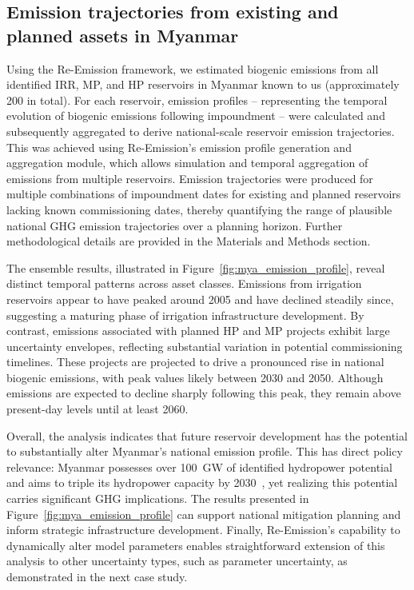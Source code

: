 \documentclass[review, authoryear, 1p]{elsarticle} %
\begin{document}
\subsection{Emission trajectories from existing and planned assets in Myanmar}
\label{subsec:myanmar}

Using the Re-Emission framework, we estimated biogenic emissions from all identified \acf{IRR}, \acf{MP}, and \acf{HP} reservoirs in Myanmar known to us (approximately 200 in total).
For each reservoir, emission profiles -- representing the temporal evolution of biogenic emissions following impoundment -- were calculated and subsequently aggregated to derive national-scale reservoir emission trajectories.
This was achieved using Re-Emission's emission profile generation and aggregation module, which allows simulation and temporal aggregation of emissions from multiple reservoirs.
Emission trajectories were produced for multiple combinations of impoundment dates for existing and planned reservoirs lacking known commissioning dates, thereby quantifying the range of plausible national \ac{GHG} emission trajectories over a planning horizon.
Further methodological details are provided in the Materials and Methods section.

The ensemble results, illustrated in Figure~\ref{fig:mya_emission_profile}, reveal distinct temporal patterns across asset classes. 
Emissions from irrigation reservoirs appear to have peaked around 2005 and have declined steadily since, suggesting a maturing phase of irrigation infrastructure development. 
By contrast, emissions associated with planned \ac{HP} and \ac{MP} projects exhibit large uncertainty envelopes, reflecting substantial variation in potential commissioning timelines.
These projects are projected to drive a pronounced rise in national biogenic emissions, with peak values likely between 2030 and 2050. 
Although emissions are expected to decline sharply following this peak, they remain above present-day levels until at least 2060. 

Overall, the analysis indicates that future reservoir development has the potential to substantially alter Myanmar's national emission profile. 
This has direct policy relevance: Myanmar possesses over 100~GW of identified hydropower potential~\citep{EA_Myanmar} and aims to triple its hydropower capacity by 2030~\citep{Aung2020}, yet realizing this potential carries significant \ac{GHG} implications. 
The results presented in Figure~\ref{fig:mya_emission_profile} can support national mitigation planning and inform strategic infrastructure development.
Finally, Re-Emission's capability to dynamically alter model parameters enables straightforward extension of this analysis to other uncertainty types, such as parameter uncertainty, as demonstrated in the next case study.
\end{document}
